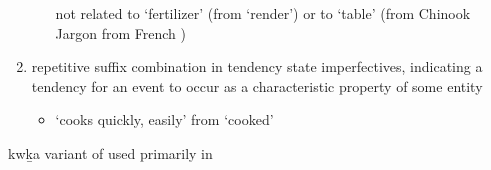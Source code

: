 \begin{morphdesc}[resume*=alphalist]
\begin{enumerate}
\begin{itemize}
			\newline
			not related to  ‘fertilizer’ (from  ‘render’)
			or to  ‘table’ (from Chinook Jargon  from French )
		\end{itemize}
	\item	repetitive suffix combination in tendency state imperfectives,
		indicating a tendency for an event to occur as a characteristic
		property of some entity
		\begin{itemize}
		\item	{} ‘cooks quickly, easily’
			from  ‘cooked’
		\end{itemize}
	\end{enumerate}

\item[kwḵa]
	variant of  used primarily in \cite{story-naish:1973}
\end{morphdesc}

